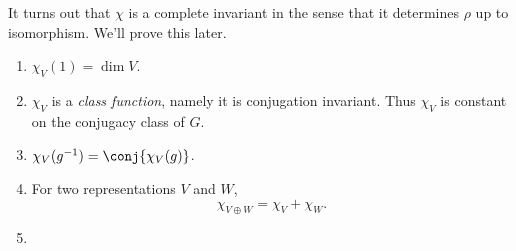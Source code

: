 \documentclass[a4paper]{article}
\begin{document}
It turns out that \(\chi\) is a complete invariant in the sense that it determines \(\rho\) up to isomorphism. We'll prove this later.

\begin{theorem}\leavevmode
  \begin{enumerate}
  \item \(\chi_V(1) = \dim V\).
  \item \(\chi_V\) is a \emph{class function}, namely it is conjugation invariant. Thus \(\chi_V\) is constant on the conjugacy class of \(G\).
  \item \(\chi_V(g^{-1}) = \conj{\chi_V(g)}\).
  \item For two representations \(V\) and \(W\),
    \[
      \chi_{V \oplus W} = \chi_V + \chi_W.
    \]
  \item 
  \end{enumerate}
\end{theorem}






\printindex
\end{document}
